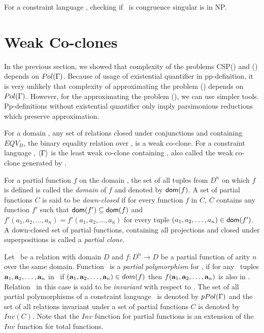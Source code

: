 \begin{theorem} 
For a constraint language \mrelset, checking if \mrelset\ is congruence singular is in NP.
\end{theorem}

\section{Weak Co-clones}
In the previous section, we showed that 
complexity of the problems CSP(\mrelset) and \ccsp(\mrelset) depends on \(Pol(\Gamma)\)\@.
Because of usage of existential quantifier in pp-definition,
it is very unlikely that
complexity of approximating the problem \ccsp(\mrelset) depends on \(Pol(\Gamma)\).
However, for the approximating the problem \ccsp(\mrelset), we can use
simpler tools. Pp-definitions without existential quantifier only imply
parsimonious reductions which preserve approximation.

For a domain \mD, any set of relations closed under conjunctions and
containing \(EQV_D\), the binary equality relation over \mD,
is a weak co-clone. For a constraint language \mrelset, 
\(\langle \Gamma \rangle\) is the least weak co-clone containing \mrelset,
also called the weak co-clone generated by \mrelset\@.

For a partial function \(f\) on the domain \mD,
the set of all tuples from \(D^n\) on which \(f\) is
defined is called the \emph{domain} of \(f\) and denoted by \({\sf dom}(f)\).
A set of partial functions \(C\) is said to be \emph{down-closed} if
for every function \(f\) in \(C\), \(C\) contains any function \(f'\) such that
\({\sf dom}(f')\subseteq{\sf dom}(f)\) and \(f'(a_1,a_2,\dotsc,a_n)=f'(a_1,a_2,\dotsc,a_n)\)
for every tuple \((a_1,a_2,\dotsc,a_n)\in {\sf dom}(f')\)\@.
A down-closed set of partial functions, 
containing all projections and closed under 
superpositions is called a \emph{partial clone}. 

Let \mR\ be a relation with domain \(D\) and \(f:D^n\to D\) be a partial function of arity \(n\)
over the same domain.
Function \mf\ is a \emph{partial polymorphism} for \mR,
if for any \mn\ tuples \(\textbf{a}_1,\textbf{a}_2,\dotsc,\textbf{a}_n\) in \mR\, 
if  \((\textbf{a}_1,\textbf{a}_2,\dotsc,\textbf{a}_n) \in dom(f)\) then 
\(f(\textbf{a}_1,\textbf{a}_2,\dotsc,\textbf{a}_n)\) is also in \mR\@. Relation \mR\ in this case is said to
be \emph{invariant} with respect to \mf\@.
The set of all partial polymorphisms of a constraint language \mrelset\ is denoted by
\(pPol(\Gamma)\) and the set of all relations invariant under a set of partial functions
\(C\) is denoted by \(Inv(C)\)\@. Note that the \(Inv\) function for partial functions is
an extension of the \(Inv\) function for total functions.

